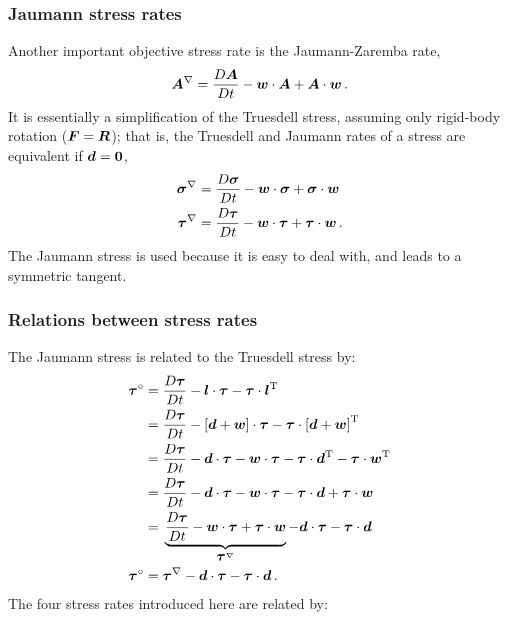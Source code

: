 \documentclass[10pt,letterpaper,oneside]{report}
\newcommand{\ten}[1]{\mbox{\boldmath $#1$}{}}
\newcommand{\scas}[1]{\mbox{{\scriptsize{${\rm{#1}}$}}}{}}
\begin{document}
\subsubsection{Jaumann stress rates} \label{Jaumann}
Another important objective stress rate is the Jaumann-Zaremba rate,
\begin{equation}
\ten{A}^{\nabla} = \frac{D \ten{A}}{D t} - \ten{w} \cdot \ten{A} + \ten{A} \cdot \ten{w} \, .
\end{equation}
It is essentially a simplification of the Truesdell stress, assuming only rigid-body rotation ($\ten{F} = \ten{R}$);  that is, the Truesdell and Jaumann rates of a stress are equivalent if $\ten{d} = \ten{0}$, 
\begin{align}
\ten{\sigma}^{\nabla} ={}& \frac{D \ten{\sigma}}{D t} - \ten{w} \cdot  \ten{\sigma} +  \ten{\sigma} \cdot \ten{w}
\\
\ten{ \tau}^{\nabla} ={}& \frac{D \ten{\tau}}{D t} - \ten{w} \cdot \ten{\tau} +  \ten{\tau} \cdot \ten{w} \, .
\end{align}
The Jaumann stress is used because it is easy to deal with, and leads to a symmetric tangent.  


\subsubsection{Relations between stress rates}
The Jaumann stress is related to the Truesdell stress by: 
\begin{align}
\ten{ \tau}^{\circ} ={}& \frac{D \ten{\tau}}{D t} -  \ten{l} \cdot \ten{\tau} - \ten{\tau} \cdot \ten{l}^{\scas{T}} 
\\
={}& \frac{D \ten{\tau}}{D t} - \left[ \ten{d} + \ten{w} \right] \cdot \ten{\tau} - \ten{\tau} \cdot \left[ \ten{d} + \ten{w} \right]^{\scas{T}} 
\notag \\
={}& \frac{D \ten{\tau}}{D t} - \ten{d} \cdot \ten{\tau} - \ten{w} \cdot \ten{\tau} - \ten{\tau} \cdot \ten{d}^{\scas{T}} - \ten{\tau} \cdot \ten{w}^{\scas{T}} 
\notag \\
={}& \frac{D \ten{\tau}}{D t} - \ten{d} \cdot \ten{\tau} - \ten{w} \cdot \ten{\tau} - \ten{\tau} \cdot \ten{d} + \ten{\tau} \cdot \ten{w} 
\notag \\
={}& \underbrace{ \frac{D \ten{\tau}}{D t} - \ten{w} \cdot \ten{\tau} + \ten{\tau} \cdot \ten{w} }_{ \ten{ \tau}^{\nabla} } - \ten{d} \cdot \ten{\tau} - \ten{\tau} \cdot \ten{d}  
\notag \\
\ten{ \tau}^{\circ} ={}& \ten{ \tau}^{\nabla} - \ten{d} \cdot \ten{\tau} - \ten{\tau} \cdot \ten{d} \, .
\end{align}
The four stress rates introduced here are related by: 
\end{document}
